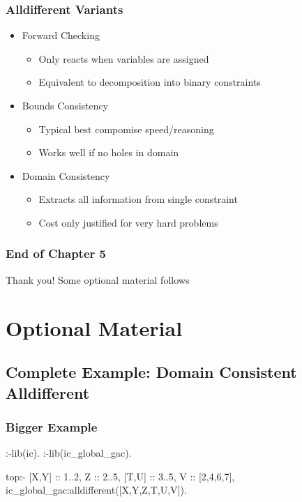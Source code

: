 \documentclass{beamer}
\begin{document}
\begin{frame}
\frametitle{Alldifferent Variants}
\begin{itemize}
\item Forward Checking
\begin{itemize}
\item Only reacts when variables are assigned
\item Equivalent to decomposition into binary constraints
\end{itemize}
\item Bounds Consistency
\begin{itemize}
\item Typical best compomise speed/reasoning
\item Works well if no holes in domain
\end{itemize}
\item Domain Consistency
\begin{itemize}
\item Extracts all information from single constraint
\item Cost only justified for very hard problems
\end{itemize}
\end{itemize}
\end{frame}

\begin{frame}
\frametitle{End of Chapter 5}
\begin{block}{Thank you!}
Some optional material follows
\end{block}
\end{frame}

\appendix
\section{Optional Material}

\subsection{Complete Example: Domain Consistent Alldifferent}

\begin{frame}[fragile]
\frametitle{Bigger Example}
\begin{semiverbatim}
:-lib(ic).
:-lib(ic_global_gac).

top:-
    [X,Y] :: 1..2,
    Z :: 2..5,
    [T,U] :: 3..5,
    V :: [2,4,6,7],
    ic_global_gac:alldifferent([X,Y,Z,T,U,V]).
\end{semiverbatim}
\end{frame}
\end{document}
